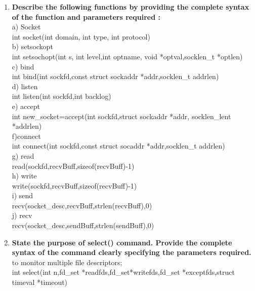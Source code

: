 \documentclass[a4paper,12pt]{article}
\begin{document}
\begin{flushleft}
\begin{enumerate}
\item \textbf{ Describe the following functions by providing the complete syntax of the function and parameters required :}\\
a) Socket\\
{\color{red}int socket(int domain, int type, int protocol)}\\
 b) setsockopt\\
 {\color{red}int setsochopt(int s, int level,int optname, void *optval,socklen\_t *optlen)}\\
 c) bind\\
 {\color{red}int bind(int sockfd,const struct sockaddr *addr,socklen\_t addrlen)}\\
 d) listen \\
 {\color{red}int listen(int sockfd,int backlog)}\\
e) accept\\
{\color{red}int new\_socket=accept(int sockfd,struct sockaddr *addr, socklen\_lent *addrlen)}\\
f)connect \\
{\color{red}int connect(int sockfd,const struct socaddr *addr,socklen\_t addrlen)}\\
g) read \\
{\color{red}read(sockfd,recvBuff,sizeof(recvBuff)-1)}\\
h) write \\
{\color{red}write(sockfd,recvBuff,sizeof(recvBuff)-1)}\\
i) send \\
{\color{red}recv(socket\_desc,recvBuff,strlen(recvBuff),0)}\\
j) recv \\
{\color{red}recv(socket\_desc,sendBuff,strlen(sendBuff),0)}\\
\item \textbf{ State the purpose of select() command. Provide the complete syntax of the command clearly specifying the parameters required.}\\
{\color{red}to monitor multiple file descriptors;\\
int select(int n,fd\_set *readfds,fd\_set*writefds,fd\_set *exceptfds,struct timeval *timeout)}\\

\end{enumerate}


\end{flushleft}
\end{document}
